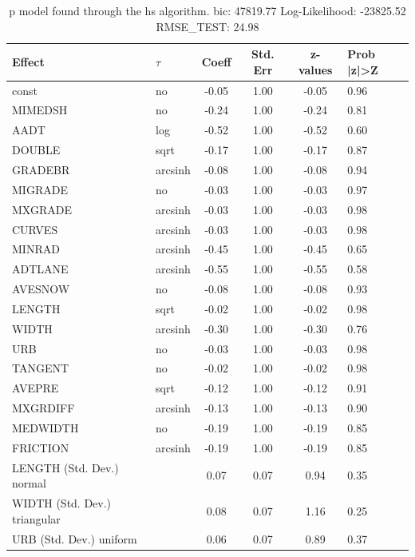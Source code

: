\begin{table}
	\caption{p model found through the hs algorithm. bic: 47819.77 Log-Likelihood: -23825.52 RMSE_TEST: 24.98}
	\begin{center}
		\begin{tabular}{|l|l|c|c|c|l|}
			\hline
			Effect & $\tau$ & Coeff & Std. Err & z-values & Prob |z|>Z \\
			\hline
			const & no & -0.05 & 1.00 & -0.05 & 0.96 \\
			\hline
			MIMEDSH & no & -0.24 & 1.00 & -0.24 & 0.81 \\
			\hline
			AADT & log & -0.52 & 1.00 & -0.52 & 0.60 \\
			\hline
			DOUBLE & sqrt & -0.17 & 1.00 & -0.17 & 0.87 \\
			\hline
			GRADEBR & arcsinh & -0.08 & 1.00 & -0.08 & 0.94 \\
			\hline
			MIGRADE & no & -0.03 & 1.00 & -0.03 & 0.97 \\
			\hline
			MXGRADE & arcsinh & -0.03 & 1.00 & -0.03 & 0.98 \\
			\hline
			CURVES & arcsinh & -0.03 & 1.00 & -0.03 & 0.98 \\
			\hline
			MINRAD & arcsinh & -0.45 & 1.00 & -0.45 & 0.65 \\
			\hline
			ADTLANE & arcsinh & -0.55 & 1.00 & -0.55 & 0.58 \\
			\hline
			AVESNOW & no & -0.08 & 1.00 & -0.08 & 0.93 \\
			\hline
			LENGTH & sqrt & -0.02 & 1.00 & -0.02 & 0.98 \\
			\hline
			WIDTH & arcsinh & -0.30 & 1.00 & -0.30 & 0.76 \\
			\hline
			URB & no & -0.03 & 1.00 & -0.03 & 0.98 \\
			\hline
			TANGENT & no & -0.02 & 1.00 & -0.02 & 0.98 \\
			\hline
			AVEPRE & sqrt & -0.12 & 1.00 & -0.12 & 0.91 \\
			\hline
			MXGRDIFF & arcsinh & -0.13 & 1.00 & -0.13 & 0.90 \\
			\hline
			MEDWIDTH & no & -0.19 & 1.00 & -0.19 & 0.85 \\
			\hline
			FRICTION & arcsinh & -0.19 & 1.00 & -0.19 & 0.85 \\
			\hline
			LENGTH (Std. Dev.) normal &  & 0.07 & 0.07 & 0.94 & 0.35 \\
			\hline
			WIDTH (Std. Dev.) triangular &  & 0.08 & 0.07 & 1.16 & 0.25 \\
			\hline
			URB (Std. Dev.) uniform &  & 0.06 & 0.07 & 0.89 & 0.37 \\

\end{tabular}
\end{center}
\end{table}
